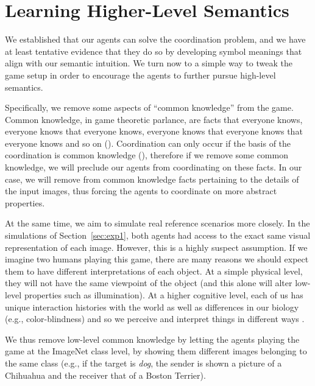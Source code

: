 \section{Learning Higher-Level Semantics}
\label{sec:exp2}

We established that our agents can solve the coordination problem, and
we have at least tentative evidence that they do so by developing
symbol meanings that align with our semantic intuition. We turn now to
a simple way to tweak the game setup in order to encourage the agents
to further pursue high-level semantics.

Specifically, we remove some aspects of ``common knowledge'' from the game. Common knowledge, in game theoretic parlance, are facts that everyone knows, everyone knows that everyone knows, everyone knows that everyone knows that everyone knows and so on (\cite{brandenburger2014hierarchies}). Coordination can only occur if the basis of the coordination is common knowledge (\cite{rubinstein1989electronic}), therefore if we remove some common knowledge, we will preclude our agents from coordinating on these facts. In our case, we will remove from common knowledge facts pertaining to the details of the input images, thus forcing the agents to coordinate on more abstract properties.

At the same time, we aim to simulate real reference scenarios more
closely.  In the simulations of Section~\ref{sec:exp1}, both agents
had access to the exact same visual representation of each
image. However, this is a highly suspect assumption. If we imagine two
humans playing this game, there are many reasons we should expect them
to have different interpretations of each object. At a simple physical
level, they will not have the same viewpoint of the object (and this
alone will alter low-level properties such as illumination). At a
higher cognitive level, each of us has unique interaction histories
with the world as well as differences in our biology (e.g.,
color-blindness) and so we perceive and interpret things in different
ways \cite{}.

We thus remove low-level common knowledge by letting the agents playing the game at the ImageNet class level, by showing them different images
belonging to the same class (e.g., if the target is \emph{dog}, the
sender is shown a picture of a Chihuahua and the receiver that of a
Boston Terrier).

